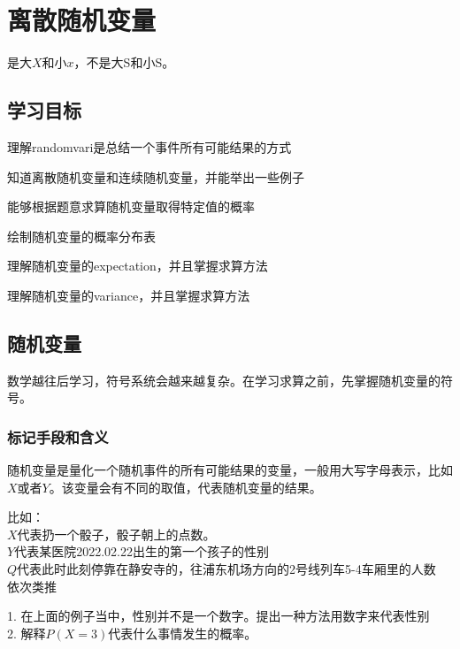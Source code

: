 \chapter{离散随机变量}
是大$X$和小$x$，不是大S和小S。

\section*{学习目标}
\begin{todolist}
 \item 理解\gls{randomvari}是总结一个事件所有可能结果的方式
 \item 知道离散随机变量和连续随机变量，并能举出一些例子
 \item 能够根据题意求算随机变量取得特定值的概率
 \item 绘制随机变量的概率分布表
 \item 理解随机变量的\gls{expectation}，并且掌握求算方法
 \item 理解随机变量的\gls{variance}，并且掌握求算方法
\end{todolist}

\clearpage


\section{随机变量}
数学越往后学习，符号系统会越来越复杂。在学习求算之前，先掌握随机变量的符号。
\subsection*{标记手段和含义}
随机变量是量化一个随机事件的所有可能结果的变量，一般用大写字母表示，比如$X$或者$Y$。该变量会有不同的取值，代表随机变量的结果。

比如：\\
$X$代表扔一个骰子，骰子朝上的点数。\\
$Y$代表某医院2022.02.22出生的第一个孩子的性别\\
$Q$代表此时此刻停靠在静安寺的，往浦东机场方向的2号线列车5-4车厢里的人数\\

依次类推
\begin{TaskBox}
1. 在上面的例子当中，性别并不是一个数字。提出一种方法用数字来代表性别\\
2. 解释$P(X=3)$代表什么事情发生的概率。
\end{TaskBox}


